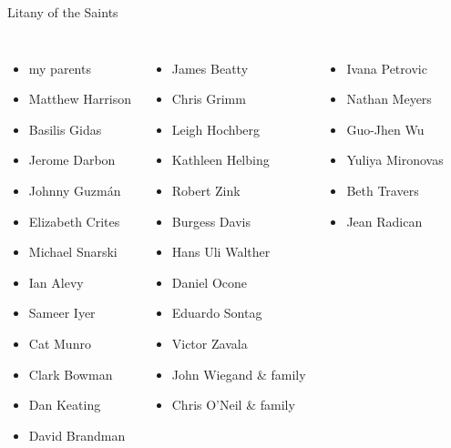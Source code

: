\documentclass[aspectratio=169,19pt,xetex,handout]{beamer}
\begin{document}
\begin{frame}{Litany of the Saints}
\vspace{-15pt}

\begin{columns}
\column[t]{0.25\paperwidth}
\begin{itemize}
    \item my parents
    \item Matthew Harrison
    \item Basilis Gidas
    \item Jerome Darbon
    \item Johnny Guzm\'an
    \item Elizabeth Crites
    \item Michael Snarski
    \item Ian Alevy
    \item Sameer Iyer
    \item Cat Munro
    \item Clark Bowman
    \item Dan Keating
    \item David Brandman
\end{itemize}
\column[t]{0.25\paperwidth}
\begin{itemize}
    \item James Beatty
    \item Chris Grimm
    \item Leigh Hochberg
    \item Kathleen Helbing
    \item Robert Zink
    \item Burgess Davis
    \item Hans Uli Walther
    \item Daniel Ocone
    \item Eduardo Sontag
    \item Victor Zavala
    \item John Wiegand \& family
    \item Chris O'Neil \& family
\end{itemize}
\column[t]{0.25\paperwidth}
\begin{itemize}
    \item Ivana Petrovic
    \item Nathan Meyers
    \item Guo-Jhen Wu
    \item Yuliya Mironovas
    \item Beth Travers
    \item Jean Radican

\end{itemize}
\end{columns}
\end{frame}
\end{document}
